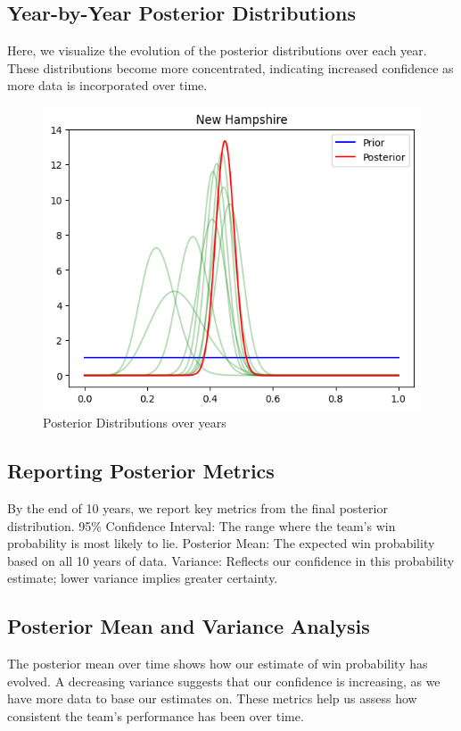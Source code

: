 \subsection{Year-by-Year Posterior Distributions}

Here, we visualize the evolution of the posterior distributions over each year.
These distributions become more concentrated, indicating increased confidence as more data is incorporated over time.

\begin{figure}[!ht]
  \centering
  \includegraphics[width=.6\textwidth]{Project1/Report/images/posterior-years.png}
  \caption{Posterior Distributions over years}
\end{figure}

\subsection{Reporting Posterior Metrics}

By the end of 10 years, we report key metrics from the final posterior distribution.
95\% Confidence Interval: The range where the team’s win probability is most likely to lie.
Posterior Mean: The expected win probability based on all 10 years of data.
Variance: Reflects our confidence in this probability estimate; lower variance implies greater certainty.

\subsection{Posterior Mean and Variance Analysis}

The posterior mean over time shows how our estimate of win probability has evolved.
A decreasing variance suggests that our confidence is increasing, as we have more data to base our estimates on.
These metrics help us assess how consistent the team’s performance has been over time.


